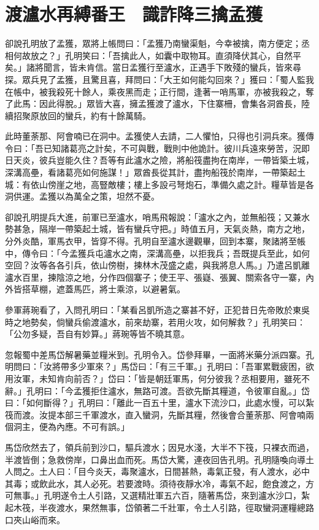 
\chapter{渡瀘水再縛番王　識詐降三擒孟獲}

卻說孔明放了孟獲，眾將上帳問曰：「孟獲乃南蠻渠魁，今幸被擒，南方便定；丞相何故放之？」孔明笑曰：「吾擒此人，如囊中取物耳。直須降伏其心，自然平矣。」諸將聞言，皆未肯信。當日孟獲行至瀘水，正遇手下敗殘的蠻兵，皆來尋探。眾兵見了孟獲，且驚且喜，拜問曰：「大王如何能勾回來？」獲曰：「蜀人監我在帳中，被我殺死十餘人，乘夜黑而走；正行間，逢著一哨馬軍，亦被我殺之，奪了此馬：因此得脫。」眾皆大喜，擁孟獲渡了瀘水，下住寨柵，會集各洞酋長，陸續招聚原放回的蠻兵，約有十餘萬騎。

此時董荼那、阿會喃已在洞中。孟獲使人去請，二人懼怕，只得也引洞兵來。獲傳令曰：「吾已知諸葛亮之計矣，不可與戰，戰則中他詭計。彼川兵遠來勞苦，況即日天炎，彼兵豈能久住？吾等有此瀘水之險，將船筏盡拘在南岸，一帶皆築土城，深溝高壘，看諸葛亮如何施謀！」眾酋長從其計，盡拘船筏於南岸，一帶築起土城：有依山傍崖之地，高豎敵樓；樓上多設弓弩炮石，準備久處之計。糧草皆是各洞供運。孟獲以為萬全之策，坦然不憂。

卻說孔明提兵大進，前軍已至瀘水，哨馬飛報說：「瀘水之內，並無船筏；又兼水勢甚急，隔岸一帶築起土城，皆有蠻兵守把。」時值五月，天氣炎熱，南方之地，分外炎酷，軍馬衣甲，皆穿不得。孔明自至瀘水邊觀畢，回到本寨，聚諸將至帳中，傳令曰：「今孟獲兵屯瀘水之南，深溝高壘，以拒我兵；吾既提兵至此，如何空回？汝等各各引兵，依山傍樹，揀林木茂盛之處，與我將息人馬。」乃遣呂凱離瀘水百里，揀陰涼之地，分作四個寨子；使王平、張嶷、張翼、關索各守一寨，內外皆搭草棚，遮蓋馬匹，將士乘涼，以避暑氣。

參軍蔣琬看了，入問孔明曰：「某看呂凱所造之寨甚不好，正犯昔日先帝敗於東吳時之地勢矣，倘蠻兵偷渡瀘水，前來劫寨，若用火攻，如何解救？」孔明笑曰：「公勿多疑，吾自有妙算。」蔣琬等皆不曉其意。

忽報蜀中差馬岱解暑藥並糧米到。孔明令入。岱參拜畢，一面將米藥分派四寨。孔明問曰：「汝將帶多少軍來？」馬岱曰：「有三千軍。」孔明曰：「吾軍累戰疲困，欲用汝軍，未知肯向前否？」岱曰：「皆是朝廷軍馬，何分彼我？丞相要用，雖死不辭。」孔明曰：「今孟獲拒住瀘水，無路可渡。吾欲先斷其糧道，令彼軍自亂。」岱曰：「如何斷得？」孔明曰：「離此一百五十里，瀘水下流沙口，此處水慢，可以紮筏而渡。汝提本部三千軍渡水，直入蠻洞，先斷其糧，然後會合董荼那、阿會喃兩個洞主，便為內應。不可有誤。」

馬岱欣然去了，領兵前到沙口，驅兵渡水；因見水淺，大半不下筏，只裸衣而過，半渡皆倒；急救傍岸，口鼻出血而死。馬岱大驚，連夜回告孔明。孔明隨喚向導土人問之。土人曰：「目今炎天，毒聚瀘水，日間甚熱，毒氣正發，有人渡水，必中其毒；或飲此水，其人必死。若要渡時。須待夜靜水冷，毒氣不起，飽食渡之，方可無事。」孔明遂令土人引路，又選精壯軍五六百，隨著馬岱，來到瀘水沙口，紮起木筏，半夜渡水，果然無事，岱領著二千壯軍，令土人引路，徑取蠻洞運糧總路口夾山峪而來。

